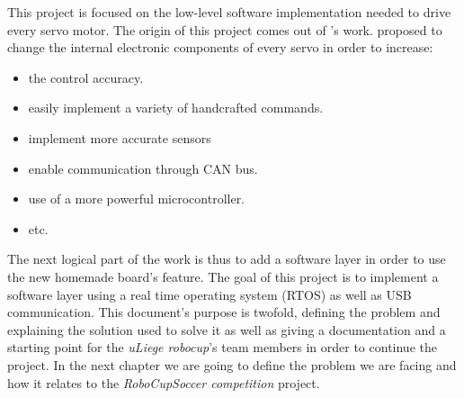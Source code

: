 \documentclass[12pt,a4paper]{report}
\begin{document}
This project is focused on the low-level software implementation needed to drive every servo motor. 
The origin of this project comes out of \cite{masterGL}'s work. \cite{masterGL} proposed to change the internal electronic components of every servo in order to increase:
\begin{itemize}
\item the control accuracy.\newline
\item easily implement a variety of handcrafted commands.\newline
\item implement more accurate sensors\newline
\item enable communication through CAN bus.\newline
\item use of a more powerful microcontroller.\newline
\item etc.\newline
\end{itemize}
The next logical part of the work is thus to add a software layer in order to use the new homemade board's feature.\newline
The goal of this project is to implement a software layer using a real time operating system (RTOS) as well as USB communication.\newline
This document's purpose is twofold, defining the problem and explaining the solution used to solve it as well as giving a documentation and a starting point for the \emph{uLiege robocup}'s team members in order to continue the project.\newline
In the next chapter we are going to define the problem we are facing and how it relates to the \emph{RoboCupSoccer competition} project. \newpage
\end{document}
